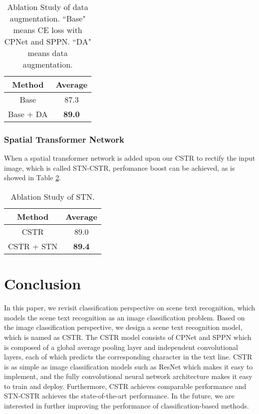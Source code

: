 \documentclass[final]{cvpr}
\begin{document}
\begin{table}[ht]
    \caption{Ablation Study of data augmentation.  ``Base" means CE loss with CPNet and SPPN. ``DA" means data augmentation.}
    \label{table.data_augmentation}
	\centering
	\begin{tabular}{ | c | c |}
		\hline
		 	Method & Average \\ 
		\hline
		Base & 87.3\\
		\hline
		Base + DA & \textbf{89.0}\\
		\hline
	\end{tabular}
\end{table}

\subsubsection{Spatial Transformer Network}
When a spatial transformer network is added upon our CSTR to rectify the input image, which is called STN-CSTR,  perfomance boost can be achieved, as is showed in Table \ref{table.stn}.

\begin{table}[ht]
    \caption{Ablation Study of STN.}
    \label{table.stn}
	\centering
	\begin{tabular}{ | c | c |}
		\hline
		 	Method & Average \\ 
		\hline
		CSTR & 89.0\\
		\hline
		CSTR + STN & \textbf{89.4}\\
		\hline
	\end{tabular}
\end{table}

\section{Conclusion}
In this paper, we revisit classification perspective on scene text recognition, which models the scene text recognition as an image classification problem. Based on the image classification perspective, we design a scene text recognition model, which is named as CSTR.
The CSTR model consists of 
CPNet and SPPN which is composed of a global average pooling layer and independent convolutional layers, each of which predicts the corresponding character in the text line.
CSTR is as simple as image classification models such as ResNet \cite{he2016deep} which makes it easy to implement, and the fully convolutional neural network architecture makes it easy to train and deploy. 
Furthermore, CSTR achieves comparable performance and STN-CSTR achieves the state-of-the-art performance.
In the future, we are interested in further improving the performance of classification-based methods.
\end{document}

